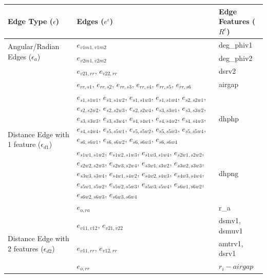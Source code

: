 \documentclass{report} %
\begin{document}
\begin{enumerate}
    \begin{table}[H]
        \centering
        \begin{tabular}{|p{}|p{}|p{}|}
        \hline 
        {\bf Edge Type (\(\epsilon\))} & {\bf Edges (\( e^{\epsilon} \))} & {\bf Edge Features (\( R^{\epsilon}\))}  \\
        \hline
        \multirow{2}{0.2\textwidth}{Angular/Radian Edges (\( \epsilon_a \))} & \( e_{v1m1, v1m2} \) & deg\_phiv1 \\
                                                                & \( e_{v2m1, v2m2} \) & deg\_phiv2 \\
        \hline
        \multirow{5}{0.2\textwidth}{Distance Edge with 1 feature (\( \epsilon_{d1} \))} & \( e_{v21,rr} \), \( e_{v22,rr} \) & dsrv2 \\
                    & \( e_{rr,s1} \), \( e_{rr,s2} \), \( e_{rr,s3} \), \( e_{rr,s4} \), \( e_{rr,s5} \), \( e_{rr,s6} \) & airgap \\
                    & \( e_{s1,s1w1} \), \( e_{s1,s1w2} \), \( e_{s1,s1w3} \), \( e_{s1,s1w4} \), \( e_{s2,s2w1} \), \( e_{s2,s2w2} \),
                    \( e_{s2,s2w3} \), \( e_{s2,s2w4} \), \( e_{s3,s3w1} \), \( e_{s3,s3w2} \), \( e_{s3,s3w3} \), \( e_{s3,s3w4} \),
                    \( e_{s4,s4w1} \), \( e_{s4,s4w2} \), \( e_{s4,s4w3} \), \( e_{s4,s4w4} \), \( e_{s5,s5w1} \), \( e_{s5,s5w2} \),
                    \( e_{s5,s5w3} \), \( e_{s5,s5w4} \), \( e_{s6,s6w1} \), \( e_{s6,s6w2} \), \( e_{s6,s6w3} \), \( e_{s6,s6w4} \) & dhphp \\
                    &\( e_{s1w1,s1w2} \), \( e_{s1w2,s1w3} \), \( e_{s1w3,s1w4} \), \( e_{s2w1,s2w2} \), \( e_{s2w2,s2w3} \), \( e_{s2w3,s2w4} \),
                    \( e_{s3w1,s3w2} \), \( e_{s3w2,s3w3} \), \( e_{s3w3,s3w4} \), \( e_{s4w1,s4w2} \), \( e_{s4w2,s4w3} \), \( e_{s4w3,s4w4} \), 
                    \( e_{s5w1,s5w2} \), \( e_{s5w2,s5w3} \), \( e_{s5w3,s5w4} \), \( e_{s6w1,s6w2} \), \( e_{s6w2,s6w3} \), \( e_{s6w3,s6w4} \) & dhpng \\
                    &\( e_{o,ra} \) & r\_a \\
        
        \hline
        \multirow{3}{0.2\textwidth}{Distance Edge with 2 features (\( \epsilon_{d2} \))} & \( e_{v11, v12} \), \( e_{v21, v22} \) & dsmv1, dsmuv1 \\
                                                                & \( e_{v11, rr} \), \( e_{v12, rr} \) & amtrv1, dsrv1 \\
                                                                & \( e_{o, rr} \) & $r_i - airgap$ \\


\end{tabular}
\end{table}
\end{enumerate}
\end{document}

